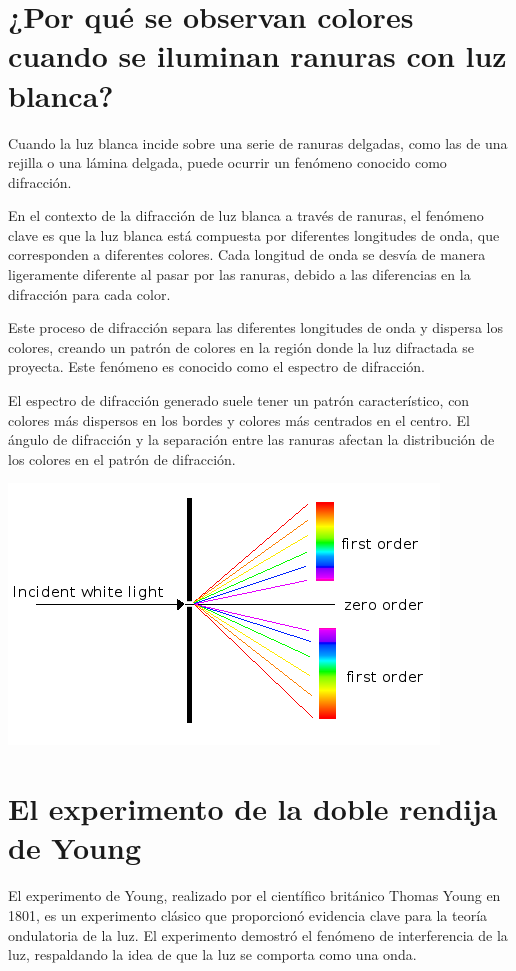 \documentclass[a4paper,12pt]{article}
\newenvironment{Figure}
  {\par\medskip\noindent\minipage{\linewidth}}
  {\endminipage\par\medskip}
\begin{document}
\section*{¿Por qué se observan colores cuando se iluminan ranuras con luz blanca?}

    Cuando la luz blanca incide sobre una serie de ranuras delgadas, como las de una rejilla o una lámina delgada, puede ocurrir un fenómeno conocido como difracción.

    En el contexto de la difracción de luz blanca a través de ranuras, el fenómeno clave es que la luz blanca está compuesta por diferentes longitudes de onda, que corresponden a diferentes colores. Cada longitud de onda se desvía de manera ligeramente diferente al pasar por las ranuras, debido a las diferencias en la difracción para cada color.

    Este proceso de difracción separa las diferentes longitudes de onda y dispersa los colores, creando un patrón de colores en la región donde la luz difractada se proyecta. Este fenómeno es conocido como el espectro de difracción.

    El espectro de difracción generado suele tener un patrón característico, con colores más dispersos en los bordes y colores más centrados en el centro. El ángulo de difracción y la separación entre las ranuras afectan la distribución de los colores en el patrón de difracción.

    \begin{Figure}
        \centering
        \includegraphics[width=0.6\linewidth]{Diffraction.png}
        \label{fig: patronDifraccion}
    \end{Figure}

\section*{El experimento de la doble rendija de Young}

    El experimento de Young, realizado por el científico británico Thomas Young en 1801, es un experimento clásico que proporcionó evidencia clave para la teoría ondulatoria de la luz. El experimento demostró el fenómeno de interferencia de la luz, respaldando la idea de que la luz se comporta como una onda.
\end{document}
